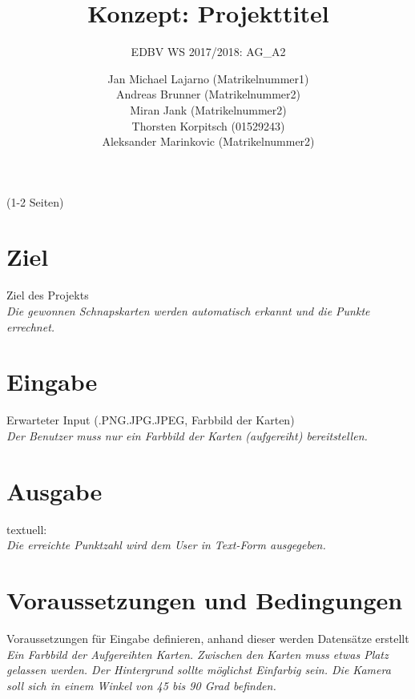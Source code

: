\documentclass[deutsch]{scrartcl}
\begin{document}
\title{Konzept: Projekttitel} %

\subtitle{EDBV WS 2017/2018: AG\_A2} %


\author{Jan Michael Lajarno (Matrikelnummer1)\\
Andreas Brunner (Matrikelnummer2)\\
Miran Jank (Matrikelnummer2)\\
Thorsten Korpitsch (01529243)\\
Aleksander Marinkovic (Matrikelnummer2)\\
}




\maketitle



(1-2 Seiten)
\section{Ziel}
Ziel des Projekts\\
\textit{Die gewonnen Schnapskarten werden automatisch erkannt und die Punkte errechnet.}
\section{Eingabe}
Erwarteter Input (.PNG\/.JPG\/.JPEG, Farbbild der Karten)\\
\textit{Der Benutzer muss nur ein Farbbild der Karten (aufgereiht) bereitstellen.}
\section{Ausgabe}
textuell:\\
\textit{Die erreichte Punktzahl wird dem User in Text-Form ausgegeben.}
\section{Voraussetzungen und Bedingungen}
Voraussetzungen für Eingabe definieren, anhand dieser werden Datensätze erstellt\\
\textit{Ein Farbbild der Aufgereihten Karten. Zwischen den Karten muss etwas Platz gelassen werden. Der Hintergrund sollte möglichst Einfarbig sein. Die Kamera soll sich in einem Winkel von 45 bis 90 Grad befinden.}
\end{document}
